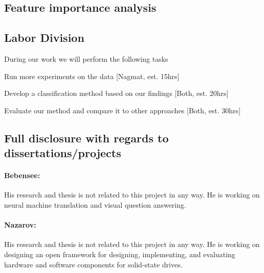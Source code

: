 \subsection{Feature importance analysis}



\subsection{Labor Division}

During our work we will perform the following tasks
\bit
\item Run more experiments on the data [Nagmat, est. 15hrs]
\item Develop a classification method based on our findings [Both, est. 20hrs]
\item Evaluate our method and compare it to other approaches [Both, est. 30hrs]
\eit

\subsection{Full disclosure with regards to dissertations/projects}

\paragraph{Bebensee:}
His research and thesis is not related to this project in any way. He is working on neural machine translation and visual question answering.

\paragraph{Nazarov:}
His research and thesis is not related to this project in any way. He is working on designing an open framework for designing, implementing, and evaluating hardware and software components for solid-state drives. 